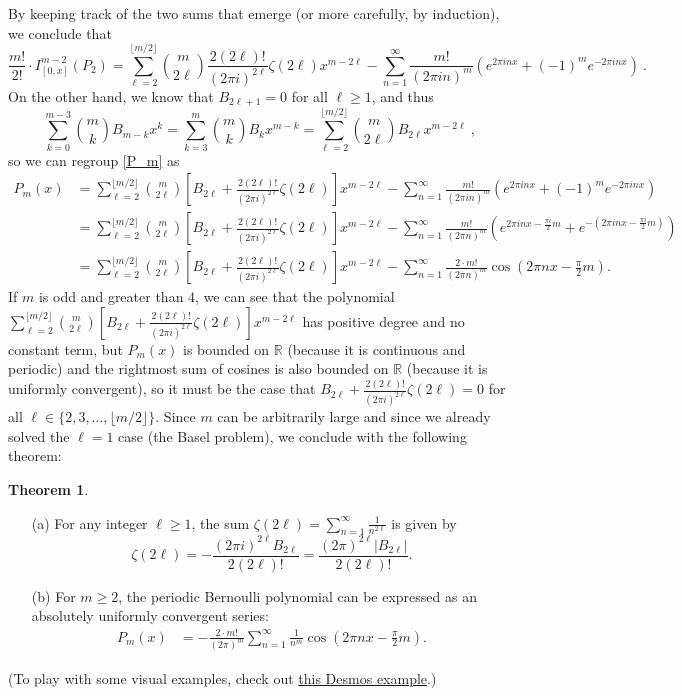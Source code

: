 \documentclass{article}
\newcommand\R{\mathbb{R}}
\theoremstyle{definition}
\newtheorem{theorem}{Theorem}[section]
\numberwithin{equation}{subsection}
\begin{document}
By keeping track of the two sums that emerge (or more carefully, by induction), we conclude that
$$\frac{m!}{2!}\cdot I_{[0,x]}^{m-2}(P_2)=\sum_{\ell=2}^{\lfloor m/2\rfloor}\binom{m}{2\ell}\frac{2(2\ell)!}{(2\pi i)^{2\ell}}\zeta(2\ell)x^{m-2\ell}-\sum_{n=1}^\infty\frac{m!}{(2\pi in)^m}\left(e^{2\pi inx}+(-1)^me^{-2\pi inx}\right)~.$$ On the other hand, we know that $B_{2\ell+1}=0$ for all $\ell\geq 1$, and thus $$\sum_{k=0}^{m-3}\binom{m}{k}B_{m-k}x^k=\sum_{k=3}^m\binom{m}{k}B_kx^{m-k}=\sum_{\ell=2}^{\lfloor m/2\rfloor}\binom{m}{2\ell}B_{2\ell}x^{m-2\ell}~,$$ so we can regroup \eqref{P_m} as 
\begin{align*}
P_m(x)&=\sum_{\ell=2}^{\lfloor m/2\rfloor}\binom{m}{2\ell}\left[B_{2\ell}+\frac{2(2\ell)!}{(2\pi i)^{2\ell}}\zeta(2\ell)\right]x^{m-2\ell}-\sum_{n=1}^\infty\frac{m!}{(2\pi in)^m}\left(e^{2\pi inx}+(-1)^me^{-2\pi inx}\right)\\
&=\sum_{\ell=2}^{\lfloor m/2\rfloor}\binom{m}{2\ell}\left[B_{2\ell}+\frac{2(2\ell)!}{(2\pi i)^{2\ell}}\zeta(2\ell)\right]x^{m-2\ell}-\sum_{n=1}^\infty\frac{m!}{(2\pi n)^m}\left(e^{2\pi inx-\frac{\pi i}{2}m}+e^{-(2\pi inx-\frac{\pi i}{2}m)}\right)\\
&=\sum_{\ell=2}^{\lfloor m/2\rfloor}\binom{m}{2\ell}\left[B_{2\ell}+\frac{2(2\ell)!}{(2\pi i)^{2\ell}}\zeta(2\ell)\right]x^{m-2\ell}-\sum_{n=1}^\infty\frac{2\cdot m!}{(2\pi n)^m}\cos\left(2\pi nx-\frac{\pi}{2}m\right).
\end{align*}
If $m$ is odd and greater than $4$, we can see that the polynomial $\sum_{\ell=2}^{\lfloor m/2\rfloor}\binom{m}{2\ell}\left[B_{2\ell}+\frac{2(2\ell)!}{(2\pi i)^{2\ell}}\zeta(2\ell)\right]x^{m-2\ell}$ has positive degree and no constant term, but $P_m(x)$ is bounded on $\R$ (because it is continuous and periodic) and the rightmost sum of cosines is also bounded on $\R$ (because it is uniformly convergent), so it must be the case that $B_{2\ell}+\frac{2(2\ell)!}{(2\pi i)^{2\ell}}\zeta(2\ell)=0$ for all $\ell\in\{2,3,\dots,\lfloor m/2\rfloor\}$. Since $m$ can be arbitrarily large and since we already solved the $\ell=1$ case (the Basel problem), we conclude with the following theorem:

\begin{theorem}\
\begin{itemize}
\item[(a)] For any integer $\ell\geq 1$, the sum $\zeta(2\ell)=\sum_{n=1}^\infty\frac{1}{n^{2\ell}}$ is given by $$\zeta(2\ell)=-\frac{(2\pi i)^{2\ell}B_{2\ell}}{2(2\ell)!}=\frac{(2\pi)^{2\ell}|B_{2\ell}|}{2(2\ell)!}.$$
\item[(b)] For $m\geq 2$, the periodic Bernoulli polynomial can be expressed as an absolutely uniformly convergent series:
\begin{align*}
P_m(x)&=-\frac{2\cdot m!}{(2\pi)^m}\sum_{n=1}^\infty\frac{1}{n^m}\cos\left(2\pi nx-\frac{\pi}{2}m\right).
\end{align*}
\end{itemize}
\end{theorem}
(To play with some visual examples, check out \href{https://www.desmos.com/calculator/vlyzrs79lv}{this Desmos example}.)
\end{document}
